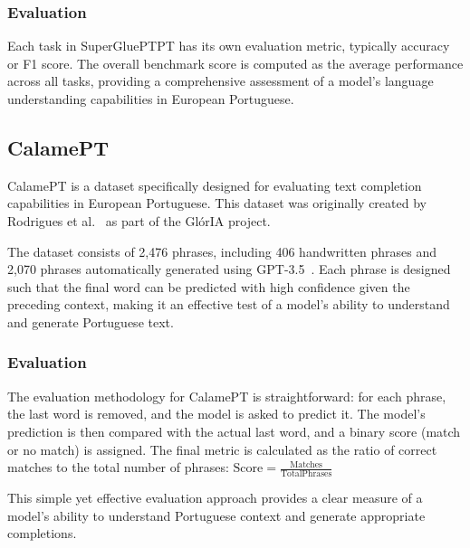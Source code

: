 \subsubsection{Evaluation}
Each task in SuperGluePTPT has its own evaluation metric, typically accuracy or F1 score. The overall benchmark score is computed as the average performance across all tasks, providing a comprehensive assessment of a model's language understanding capabilities in European Portuguese.

\subsection{CalamePT}\label{Section3.3.2}
CalamePT is a dataset specifically designed for evaluating text completion capabilities in European Portuguese. This dataset was originally created by Rodrigues et al.~\cite{Gloria} as part of the GlórIA project.

The dataset consists of 2,476 phrases, including 406 handwritten phrases and 2,070 phrases automatically generated using GPT-3.5~\cite{Chat-GPT}. Each phrase is designed such that the final word can be predicted with high confidence given the preceding context, making it an effective test of a model's ability to understand and generate Portuguese text.

\subsubsection{Evaluation}
The evaluation methodology for CalamePT is straightforward: for each phrase, the last word is removed, and the model is asked to predict it. The model's prediction is then compared with the actual last word, and a binary score (match or no match) is assigned. The final metric is calculated as the ratio of correct matches to the total number of phrases: $\text{Score} = \frac{\text{Matches}}{\text{TotalPhrases}}$

This simple yet effective evaluation approach provides a clear measure of a model's ability to understand Portuguese context and generate appropriate completions.
